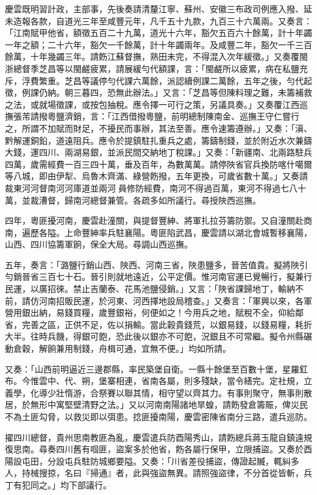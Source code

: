 \begin{pinyinscope}
慶雲既明習計政，主部事，先後奏請清釐江寧、蘇州、安徽三布政司例應入撥、延未造報各款，自道光三年至咸豐元年，凡千五十九款，九百三十六萬兩。又奏言：「江南賦甲他省，額徵五百二十九萬，道光十六年，豁欠五百六十餘萬，計十年蠲一年之額；二十六年，豁欠一千餘萬，計十年蠲兩年。及咸豐二年，豁欠一千三百餘萬，十年幾蠲三年。請飭江蘇督撫，熟田未完，不得混入次年緩徵。」又奏覆閩浙總督季芝昌等以閩鹺疲累，請展緩勻代額課，言：「閩鹺所以疲累，病在私鹽充斥，浮費繁重。芝昌等議停勻代課六萬餘，派認續例課二萬餘，五年之後，勻代起徵，例課仍納。朝三暮四，恐無此辦法。」又言：「芝昌等但陳料理之難，未籌補救之法，或就場徵課，或按包抽稅。應令擇一可行之策，另議具奏。」又奏覆江西巡撫張芾請撥粵鹽濟銷，言：「江西借撥粵鹽，前明總制陳南金、巡撫王守仁嘗行之，所謂不加賦而財足，不擾民而事辦，其法至善。應令速籌遵辦。」又奏：「滇、黔解運銅鉛，道遠阻兵。應令於提鎮駐扎重兵之處，籌鑄制錢，並於附近水次兼鑄大錢，運四川、兩湖易銀，並派民間交納地丁稅課。」又奏：「新疆南、北兩路駐兵四萬，歲需經費一百三四十萬，垂及百年，為數萬萬。請停陜省官兵換防喀什噶爾等八城，即由伊犁、烏魯木齊滿、綠營飭撥，五年更換，可歲省數十萬。」又奏請裁東河河督南河河庫道並兩河員修防經費，南河不得過百萬，東河不得過七八十萬，並裁漕督，歸南河總督兼管。各疏多如所議行。尋授陜西巡撫。

四年，粵匪擾河南，慶雲赴潼關，與提督豐紳、將軍扎拉芬籌防禦。又自潼關赴商南，遍歷各隘。上命豐紳率兵駐襄陽。粵匪陷武昌，慶雲請以湖北會城暫移襄陽，山西、四川協籌軍餉，保全大局。尋調山西巡撫。

五年，奏言：「潞鹽行銷山西、陜西、河南三省，陜患鹽多，晉苦值貴。擬將陜引勻銷晉省三百七十石。晉引則就地遠近，公平定價。惟河南官運已覺暢行，擬兼行民運，以廣招徠。禁止吉蘭泰、花馬池鹽侵銷。」又言：「陜省課歸地丁，輸納不前，請仿河南招販民運，於河東、河西擇地設局稽查。」又奏言：「軍興以來，各軍營用銀出納，易錢買糧，歲豐銀裕，何便如之！今用兵之地，賦稅不全，仰給鄰省，完善之區，正供不足，佐以捐輸。當此穀貴錢荒，以銀易錢，以錢易糧，耗折大半。往時兵饑，得銀可飽，恐此後以銀亦不可飽，況銀且不可常繼。擬令州縣碾動倉穀，解餉兼用制錢，舟楫可通，宜無不便。」均如所請。

又奏：「山西前明逼近三邊郡縣，率民築堡自衛。一縣十餘堡至百數十堡，星羅釭布。今惟雲中、代、朔，堡寨相連，省南各屬，則多殘缺，當令繕完。定社規，立義學，化導少壯惰游，合祭賽以聯其情，相守望以齊其力。有事則聚守，無事則散居，於無形中寓堅壁清野之法。」又以河南南陽諸地旱蝗，請飭發倉籌賑，俾災民不為土匪勾脅，以救災即以弭患。捻匪擾南陽，慶雲密陳省南分三路，遣兵巡防。

擢四川總督，貴州思南教匪為亂，慶雲遣兵防酉陽秀山，請飭總兵蔣玉龍自鎮遠規復思南。尋奏四川舊有啯匪，盜案多於他省，飭各屬行保甲，立限捕盜。又奏於酉陽設屯田，分設屯兵駐防城鄉要隘。又奏：「川省差役捕盜，傳證起贓，輒糾多人，持械搜掠，名曰『掃通』者，此與強盜無異。請照強盜律，不分首從皆斬，兵丁有犯同之。」均下部議行。


\end{pinyinscope}
